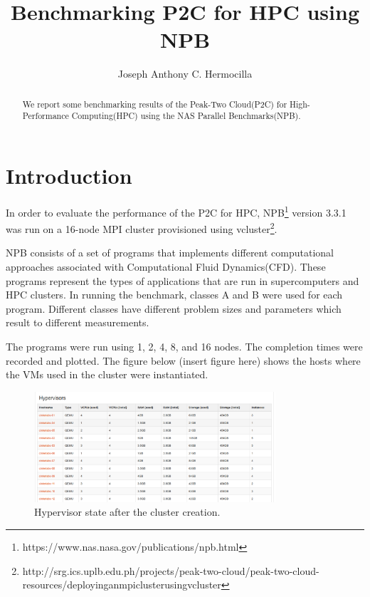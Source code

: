 \documentclass[a4paper]{article}
\title{Benchmarking P2C for HPC using NPB}
\author{Joseph Anthony C. Hermocilla}
\begin{document}
\maketitle

\begin{abstract}
We report some benchmarking results of the Peak-Two Cloud(P2C) for High-Performance Computing(HPC) using the NAS Parallel Benchmarks(NPB).
\end{abstract}

\section{Introduction}

In order to evaluate the performance of the P2C\cite{hermocilla-p2c-ncite2014} for HPC, NPB\footnote{https://www.nas.nasa.gov/publications/npb.html} version 3.3.1 was run on a 16-node MPI cluster provisioned using vcluster\footnote{http://srg.ics.uplb.edu.ph/projects/peak-two-cloud/peak-two-cloud-resources/deployinganmpiclusterusingvcluster}.

NPB consists of a set of programs that implements different computational approaches associated with Computational Fluid Dynamics(CFD). These programs represent the types of applications that are run in supercomputers and HPC clusters. In running the benchmark, classes A and B were used for each program. Different classes have different problem sizes and parameters which result to different measurements.

The programs were run using 1, 2, 4, 8, and 16 nodes. The completion times were recorded and plotted. 
The figure below (insert figure here) shows the hosts where the VMs used in the cluster were instantiated. 

\begin{figure}[H]
\centering
\includegraphics[width=0.8\textwidth]{figures/p2c-allocation.png}
\caption{\label{fig:hypervisors} Hypervisor state after the cluster creation.}
\end{figure}
\end{document}
